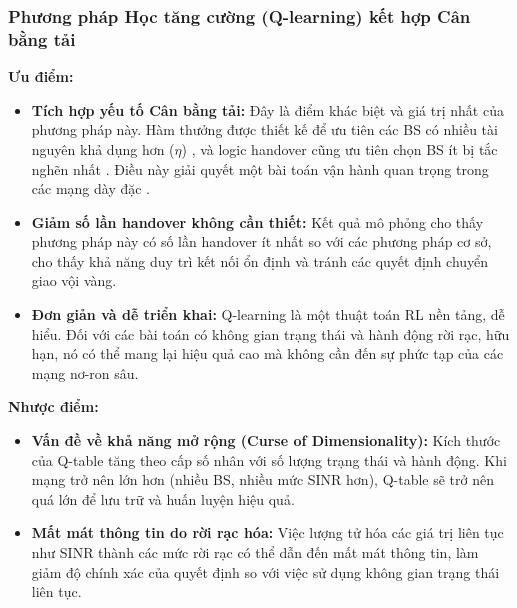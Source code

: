 \documentclass{article} %
\begin{document}
\subsubsection{Phương pháp Học tăng cường (Q-learning) kết hợp Cân bằng tải}
\textbf{Ưu điểm:}
\begin{itemize}
    \item \textbf{Tích hợp yếu tố Cân bằng tải:} Đây là điểm khác biệt và giá trị nhất của phương pháp này. Hàm thưởng được thiết kế để ưu tiên các BS có nhiều tài nguyên khả dụng hơn ($\eta$) , và logic handover cũng ưu tiên chọn BS ít bị tắc nghẽn nhất . Điều này giải quyết một bài toán vận hành quan trọng trong các mạng dày đặc .
    \item \textbf{Giảm số lần handover không cần thiết:} Kết quả mô phỏng cho thấy phương pháp này có số lần handover ít nhất so với các phương pháp cơ sở, cho thấy khả năng duy trì kết nối ổn định và tránh các quyết định chuyển giao vội vàng.
    \item \textbf{Đơn giản và dễ triển khai:} Q-learning là một thuật toán RL nền tảng, dễ hiểu. Đối với các bài toán có không gian trạng thái và hành động rời rạc, hữu hạn, nó có thể mang lại hiệu quả cao mà không cần đến sự phức tạp của các mạng nơ-ron sâu.
\end{itemize}
\textbf{Nhược điểm:}
\begin{itemize}
    \item \textbf{Vấn đề về khả năng mở rộng (Curse of Dimensionality):} Kích thước của Q-table tăng theo cấp số nhân với số lượng trạng thái và hành động. Khi mạng trở nên lớn hơn (nhiều BS, nhiều mức SINR hơn), Q-table sẽ trở nên quá lớn để lưu trữ và huấn luyện hiệu quả.
    \item \textbf{Mất mát thông tin do rời rạc hóa:} Việc lượng tử hóa các giá trị liên tục như SINR thành các mức rời rạc có thể dẫn đến mất mát thông tin, làm giảm độ chính xác của quyết định so với việc sử dụng không gian trạng thái liên tục.
\end{itemize}
\end{document}
